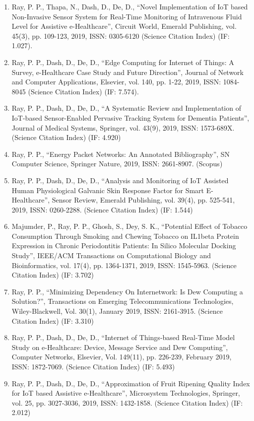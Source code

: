 \documentclass[11pt,a4paper]{moderncv}
\begin{document}
\begin{adjustwidth}{6em}{0pt}
\begin{enumerate}
		\item Ray, P. P., Thapa, N., Dash, D., De, D., “Novel Implementation of IoT based Non-Invasive Sensor System for Real-Time Monitoring of Intravenous Fluid Level for Assistive e-Healthcare”, Circuit World, Emerald Publishing, vol. 45(3), pp. 109-123, 2019, ISSN: 0305-6120 (Science Citation Index) (IF: 1.027). 
		\item Ray, P. P., Dash, D., De, D., “Edge Computing for Internet of Things: A Survey, e-Healthcare Case Study and Future Direction”, Journal of Network and Computer Applications, Elsevier, vol. 140, pp. 1-22, 2019, ISSN: 1084-8045 (Science Citation Index) (IF: 7.574). 
		\item Ray, P. P., Dash, D., De, D., “A Systematic Review and Implementation of IoT-based Sensor-Enabled Pervasive Tracking System for Dementia Patients”, Journal of Medical Systems, Springer, vol. 43(9), 2019, ISSN: 1573-689X.  (Science Citation Index) (IF: 4.920) 
		\item Ray, P. P., “Energy Packet Networks: An Annotated Bibliography”, SN Computer Science, Springer Nature, 2019, ISSN: 2661-8907. (Scopus)
		\item Ray, P. P., Dash, D., De, D., “Analysis and Monitoring of IoT Assisted Human Physiological Galvanic Skin Response Factor for Smart E-Healthcare”, Sensor Review, Emerald Publishing, vol. 39(4), pp. 525-541, 2019, ISSN: 0260-2288. (Science Citation Index) (IF: 1.544) 
		\item Majumder, P., Ray, P. P., Ghosh, S., Dey, S. K., “Potential Effect of Tobacco Consumption Through Smoking and Chewing Tobacco on IL1beta Protein Expression in Chronic Periodontitis Patients: In Silico Molecular Docking Study”, IEEE/ACM Transactions on Computational Biology and Bioinformatics, vol. 17(4), pp. 1364-1371, 2019, ISSN: 1545-5963.  (Science Citation Index) (IF: 3.702)
		\item Ray, P. P., “Minimizing Dependency On Internetwork: Is Dew Computing a Solution?”, Transactions on Emerging Telecommunications Technologies, Wiley-Blackwell, Vol. 30(1), January 2019, ISSN: 2161-3915. (Science Citation Index) (IF: 3.310)
		\item Ray, P. P., Dash, D., De, D., “Internet of Things-based Real-Time Model Study on e-Healthcare: Device, Message Service and Dew Computing”, Computer Networks, Elsevier, Vol. 149(11), pp. 226-239, February 2019, ISSN: 1872-7069. (Science Citation Index) (IF: 5.493)
		\item Ray, P. P., Dash, D., De, D., “Approximation of Fruit Ripening Quality Index for IoT based Assistive e-Healthcare”, Microsystem Technologies, Springer, vol. 25, pp. 3027-3036, 2019, ISSN: 1432-1858. (Science Citation Index) (IF: 2.012)

\end{enumerate}
\end{adjustwidth}
\end{document}
